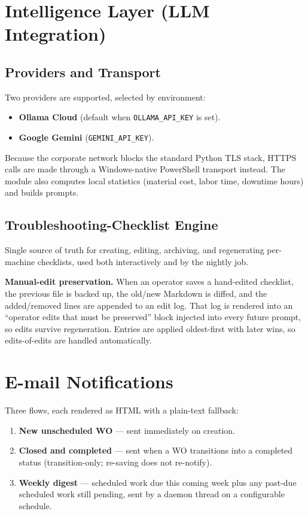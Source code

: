 \documentclass[11pt,a4paper]{article}
\newcommand{\code}[1]{\texttt{#1}}
\begin{document}
\section{Intelligence Layer (LLM Integration)}

\subsection{Providers and Transport}
Two providers are supported, selected by environment:
\begin{itemize}
    \item \textbf{Ollama Cloud} (default when \code{OLLAMA\_API\_KEY} is
          set).
    \item \textbf{Google Gemini} (\code{GEMINI\_API\_KEY}).
\end{itemize}
Because the corporate network blocks the standard Python TLS stack, HTTPS
calls are made through a Windows-native PowerShell transport instead. The
module also computes local statistics (material cost, labor time, downtime
hours) and builds prompts.

\subsection{Troubleshooting-Checklist Engine}
Single source of truth for creating, editing, archiving, and regenerating
per-machine checklists, used both interactively and by the nightly job.

\textbf{Manual-edit preservation.} When an operator saves a hand-edited
checklist, the previous file is backed up, the old/new Markdown is diffed,
and the added/removed lines are appended to an edit log. That log is
rendered into an ``operator edits that must be preserved'' block injected
into every future prompt, so edits survive regeneration. Entries are
applied oldest-first with later wins, so edits-of-edits are handled
automatically.

\section{E-mail Notifications}

Three flows, each rendered as HTML with a plain-text fallback:
\begin{enumerate}
    \item \textbf{New unscheduled WO} --- sent immediately on creation.
    \item \textbf{Closed and completed} --- sent when a WO transitions into
          a completed status (transition-only; re-saving does not
          re-notify).
    \item \textbf{Weekly digest} --- scheduled work due this coming week
          plus any past-due scheduled work still pending, sent by a daemon
          thread on a configurable schedule.
\end{enumerate}
\end{document}
